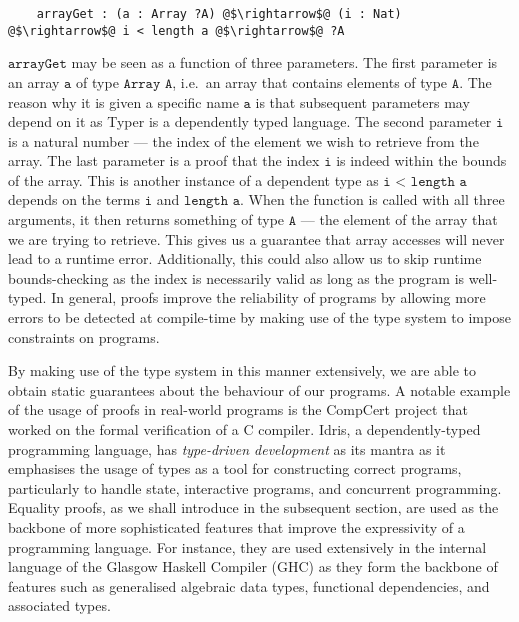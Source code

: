 \documentclass[12pt,twoside,maitrise]{dms}
\theoremstyle{definition}
\numberwithin{equation}{section}
\numberwithin{table}{chapter}
\numberwithin{figure}{chapter}
\newcommand\id[1] {\texttt{#1}}
\newcommand\fn[1] {\texttt{#1}}
\begin{document}
\begin{verbatim}
    arrayGet : (a : Array ?A) @$\rightarrow$@ (i : Nat) @$\rightarrow$@ i < length a @$\rightarrow$@ ?A
\end{verbatim}

$\fn{arrayGet}$ may be seen as a function of three parameters.
The first parameter is an array $\fn{a}$ of type $\fn{Array A}$, i.e.\ an array
that contains elements of type $\fn{A}$. The reason why it is given a specific
name $\fn{a}$ is that subsequent parameters may depend on it as Typer is a
dependently typed language. The second parameter $\fn{i}$ is a natural number
--- the index of the element we wish to retrieve from the array. The last
parameter is a proof that the index $\id{i}$ is indeed within the bounds of the
array.
This is another instance of a dependent type as $\fn{i < length a}$ depends on
the terms $\fn{i}$ and $\fn{length a}$. When the function is called with all
three arguments, it then returns something of type $\fn{A}$ --- the element of
the array that we are trying to retrieve. This gives us a guarantee that array
accesses will never lead to a runtime error. Additionally, this could also
allow us to skip runtime bounds-checking as the index is necessarily valid as
long as the program is well-typed. In general, proofs improve the reliability
of programs by allowing more errors to be detected at compile-time by making
use of the type system to impose constraints on programs.

By making use of the type system in this manner extensively, we are able to obtain
static guarantees about the behaviour of our programs. A notable example of the
usage of proofs in real-world programs is the CompCert project that worked on
the formal verification of a C compiler\cite{Leroy-Compcert-CACM}. Idris, a
dependently-typed programming language, has \emph{type-driven development} as
its mantra as it emphasises the usage of types as a tool for constructing
correct programs, particularly to handle state, interactive programs, and
concurrent programming. Equality proofs, as we shall introduce in the subsequent
section, are used as the backbone of more sophisticated features that improve
the expressivity of a programming language. For instance, they are used
extensively in the internal language of the Glasgow Haskell Compiler (GHC) as
they form the backbone of features such as generalised algebraic data types,
functional dependencies, and associated types\cite{sulzmann2007systemfeq}.
\end{document}
